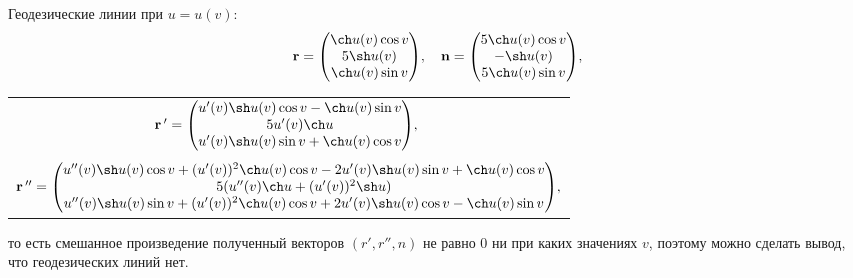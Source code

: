 \documentclass[12pt,a4paper]{article}
\newcommand{\boldVec}[1]{\mathbf #1}
\begin{document}
    Геодезические линии при $ u = u(v) \colon $
    \[
        \boldVec r =
            \begin{pmatrix}
                \ch u(v) \cos v
                \\
                5\sh u(v)
                \\
                \ch u(v) \sin v
            \end{pmatrix}\!,\quad 
        \boldVec n =
            \begin{pmatrix}
                5\ch u(v) \cos v
                \\
                -\sh u(v)
                \\
                5\ch u(v) \sin v
            \end{pmatrix}\!,
     \]
        
     \begin{table}[h]
        \centering
        \begin{tabular}{c}
            $
                \boldVec{r}\,' = 
                    \begin{pmatrix}
                        u'(v) \sh u(v) \cos v - \ch u(v) \sin v
                        \\
                        5u'(v) \ch u
                        \\
                        u'(v) \sh u(v) \sin v + \ch u(v) \cos v
                    \end{pmatrix}\!,\ 
            $
            \\ \\
            $
            \boldVec{r}\,'' = 
                \begin{pmatrix}
                    u''(v) \sh u(v) \cos v + (u'(v))^2 \ch u(v) \cos v - 2u'(v) \sh u(v) \sin v + \ch u(v) \cos v
                    \\
                    5(u''(v) \ch u + (u'(v))^2 \sh u)
                    \\
                    u''(v) \sh u(v) \sin v + (u'(v))^2 \ch u(v) \cos v + 2u'(v) \sh u(v) \cos v - \ch u(v) \sin v
                \end{pmatrix}\!,
            $
        \end{tabular}
    \end{table}

    \noindent то есть смешанное произведение полученный векторов $ (r',r'',n) $ не равно 0 ни при каких значениях $ v $, поэтому можно сделать вывод, что геодезических линий нет.
\end{document}

